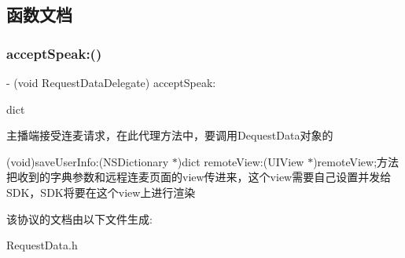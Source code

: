 \subsection{函数文档}
\mbox{\label{protocol_request_data_delegate_01-p_a4a3a3f52ad4e761a8957bd8a2c435ecf}} 
\subsubsection{\texorpdfstring{accept\+Speak\+:()}{acceptSpeak:()}}
{\footnotesize\ttfamily -\/ (void Request\+Data\+Delegate) accept\+Speak\+: \begin{DoxyParamCaption}\item[{(N\+S\+Dictionary $\ast$)}]{dict }\end{DoxyParamCaption}\hspace{0.3cm}{\ttfamily [optional]}}



主播端接受连麦请求，在此代理方法中，要调用\+Dequest\+Data对象的 


\begin{DoxyItemize}
\item (void)save\+User\+Info\+:(\+N\+S\+Dictionary $\ast$)dict remote\+View\+:(\+U\+I\+View $\ast$)remote\+View;方法 把收到的字典参数和远程连麦页面的view传进来，这个view需要自己设置并发给\+S\+D\+K，\+S\+D\+K将要在这个view上进行渲染 
\end{DoxyItemize}

该协议的文档由以下文件生成\+:\begin{DoxyCompactItemize}
\item 
Request\+Data.\+h\end{DoxyCompactItemize}
